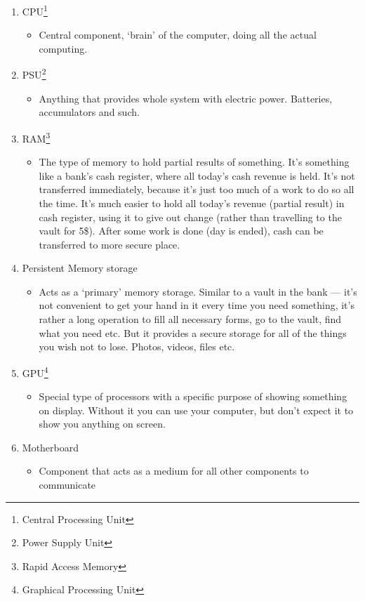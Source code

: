 \documentclass{report}
\begin{document}
            \begin{enumerate}
                \item CPU\footnote{Central Processing Unit}
                \begin{itemize}
                    \item Central component, `brain' of the computer, doing all the actual computing.
                \end{itemize}
                \item PSU\footnote{Power Supply Unit}
                \begin{itemize}
                    \item Anything that provides whole system with electric power. Batteries, accumulators and such. 
                \end{itemize}
                \item RAM\footnote{Rapid Access Memory}
                \begin{itemize}
                    \item The type of memory to hold partial results of something. It's something like a bank's cash register, where all today's cash revenue is held. It's not
                    transferred immediately, because it's just too much of a work to do so all the time. It's much easier to hold all today's revenue (partial result) in cash register,
                    using it to give out change (rather than travelling to the vault for 5\$). After some work is done (day is ended), cash can be transferred to more secure place.
                \end{itemize}
                \item Persistent Memory storage
                \begin{itemize}
                    \item Acts as a `primary' memory storage. Similar to a vault in the bank --- it's not convenient to get your hand in it every time you need something, it's
                    rather a long operation to fill all necessary forms, go to the vault, find what you need etc. But it provides a secure storage for all of the things you
                    wish not to lose. Photos, videos, files etc. 
                \end{itemize}
                \item GPU\footnote{Graphical Processing Unit}
                \begin{itemize}
                    \item Special type of processors with a specific purpose of showing something on display. Without it you can use your computer, but don't expect it to
                    show you anything on screen.  
                \end{itemize}
                \item Motherboard
                \begin{itemize}
                    \item Component that acts as a medium for all other components to communicate 
                \end{itemize}
            \end{enumerate}
\end{document}
